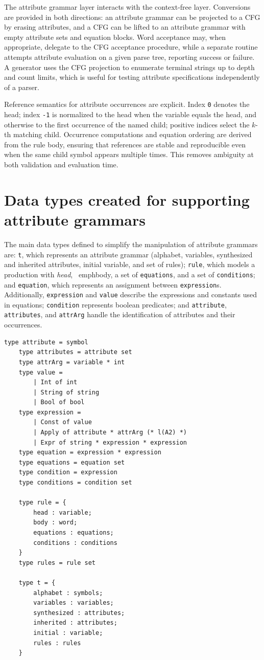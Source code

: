 The attribute grammar layer interacts with the context-free layer. Conversions are provided in both directions: an attribute grammar can be projected to 
a CFG by erasing attributes, and a CFG can be lifted to an attribute grammar with empty attribute sets and equation blocks. Word acceptance may, when 
appropriate, delegate to the CFG acceptance procedure, while a separate routine attempts attribute evaluation on a given parse tree, reporting success 
or failure. A generator uses the CFG projection to enumerate terminal strings up to depth and count limits, which is useful for testing attribute 
specifications independently of a parser.

Reference semantics for attribute occurrences are explicit. Index \texttt{0} denotes the head; index \texttt{-1} is normalized to the head when the variable 
equals the head, and otherwise to the first occurrence of the named child; positive indices select the \(k\)-th matching child. Occurrence computations and 
equation ordering are derived from the rule body, ensuring that references are stable and reproducible even when the same child symbol appears multiple 
times. This removes ambiguity at both validation and evaluation time.

\section{Data types created for supporting attribute grammars} 

The main data types defined to simplify the manipulation of attribute grammars are: \texttt{t}, which represents an attribute grammar (alphabet, 
variables, synthesized and inherited attributes, initial variable, and set of rules); \texttt{rule}, which models a production with \emph{head}, \
emph{body}, a set of \texttt{equations}, and a set of \texttt{conditions}; and \texttt{equation}, which represents an assignment between 
\texttt{expression}s. Additionally, \texttt{expression} and \texttt{value} describe the expressions and constants used in equations; 
\texttt{condition} represents boolean predicates; and \texttt{attribute}, \texttt{attributes}, and \texttt{attrArg} handle the identification of 
attributes and their occurrences.

\begin{verbatim}
type attribute = symbol
    type attributes = attribute set
    type attrArg = variable * int
    type value =
        | Int of int
        | String of string
        | Bool of bool
    type expression =
        | Const of value
        | Apply of attribute * attrArg (* l(A2) *)
        | Expr of string * expression * expression
    type equation = expression * expression
    type equations = equation set
    type condition = expression 
    type conditions = condition set

    type rule = {
        head : variable;
        body : word;
        equations : equations;
        conditions : conditions
    }
    type rules = rule set

    type t = {
        alphabet : symbols;
        variables : variables;
        synthesized : attributes;
        inherited : attributes;
        initial : variable;
        rules : rules
    }
\end{verbatim}



